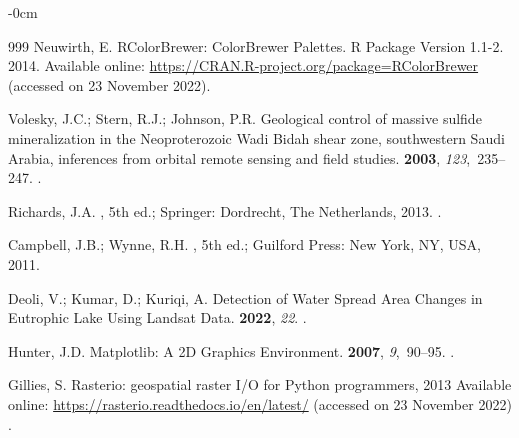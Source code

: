 \documentclass[jimaging,article,accept,pdftex,moreauthors]{Definitions/mdpi}
\begin{document}
\begin{adjustwidth}{-\extralength}{0cm}
\begin{thebibliography}{999}
Neuwirth, E.
\newblock RColorBrewer: ColorBrewer Palettes. R Package Version 1.1-2. 2014.
\newblock Available online:  
\newblock \url{https://CRAN.R-project.org/package=RColorBrewer} (accessed on 23 November 2022).%

Volesky, J.C.; Stern, R.J.; Johnson, P.R.
\newblock Geological control of massive sulfide mineralization in the
  Neoproterozoic Wadi Bidah shear zone, southwestern Saudi Arabia, inferences
  from orbital remote sensing and field studies.
 {\bf 2003}, {\em 123},~235--247.
. %

Richards, J.A.
, 5th ed.;
  Springer: Dordrecht, The Netherlands, 2013.
.

Campbell, J.B.; Wynne, R.H.
, 5th ed.; Guilford Press: New
  York, NY, USA, 2011.

Deoli, V.; Kumar, D.; Kuriqi, A.
\newblock Detection of Water Spread Area Changes in Eutrophic Lake Using
  Landsat Data.
 {\bf 2022}, {\em 22}.
.

Hunter, J.D.
\newblock Matplotlib: A 2D Graphics Environment.
 {\bf 2007}, {\em
  9},~90--95.
.

Gillies, S. 
\newblock Rasterio: geospatial raster I/O for {Python} programmers, 2013
\newblock Available online:  
\newblock \url{https://rasterio.readthedocs.io/en/latest/} (accessed on 23 November 2022)
.


\end{thebibliography}
\end{adjustwidth}
\end{document}
